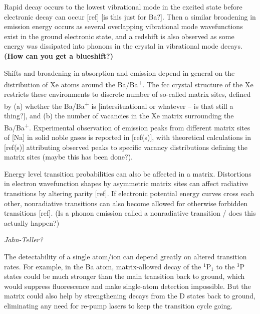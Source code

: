 Rapid decay occurs to the lowest vibrational mode in the excited state before electronic decay can occur [ref] {\color{red}[is this just for Ba?]}.  Then a similar broadening in emission energy occurs as several overlapping vibrational mode wavefunctions exist in the ground electronic state, and a redshift is also observed as some energy was dissipated into phonons in the crystal in vibrational mode decays.  {\color{blue}\textbf{(How can you get a blueshift?)}}

Shifts and broadening in absorption and emission depend in general on the distribution of Xe atoms around the Ba/Ba\textsuperscript{+}.  The fcc crystal structure of the Xe restricts these environments to discrete number of so-called matrix sites, defined by (a) whether the Ba/Ba\textsuperscript{+} is {\color{red}[intersituational or whatever -- is that still a thing?]}, and (b) the number of vacancies in the Xe matrix surrounding the Ba/Ba\textsuperscript{+}.  Experimental observation of emission peaks from different matrix sites of [Na] in solid noble gases is reported in [ref(s)], with theoretical calculations in [ref(s)] attributing observed peaks to specific vacancy distributions defining the matrix sites (maybe this has been done?).

Energy level transition probabilities can also be affected in a matrix.  Distortions in electron wavefunction shapes by asymmetric matrix sites can affect radiative transitions by altering parity [ref].  If electronic potential energy curves cross each other, nonradiative transitions can also become allowed for otherwise forbidden transitions [ref].  {\color{red}(Is a phonon emission called a nonradiative transition / does this actually happen?)}

\emph{Jahn-Teller?}

The detectability of a single atom/ion can depend greatly on altered transition rates.  For example, in the Ba atom, matrix-allowed decay of the $^{1}$P$_{1}$ to the $^{3}$P states could be much stronger than the main transition back to ground, which would suppress fluorescence and make single-atom detection impossible.  But the matrix could also help by strengthening decays from the D states back to ground, eliminating any need for re-pump lasers to keep the transition cycle going.  